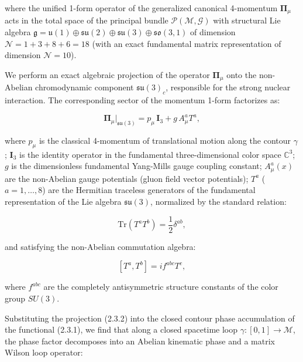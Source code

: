 \documentclass[11pt,a4paper]{article}
\theoremstyle{definition}
\begin{document}
where the unified 1-form operator of the generalized canonical 4-momentum $\mathbf{\Pi}_\mu$ acts in the total space of the principal bundle $\mathcal{P}(\mathcal{M}, \mathcal{G})$ with structural Lie algebra $\mathfrak{g} = \mathfrak{u}(1) \oplus \mathfrak{su}(2) \oplus \mathfrak{su}(3) \oplus \mathfrak{so}(3,1)$ of dimension $\mathcal{N} = 1 + 3 + 8 + 6 = 18$ (with an exact fundamental matrix representation of dimension $\mathcal{N} = 10$).

We perform an exact algebraic projection of the operator $\mathbf{\Pi}_\mu$ onto the non-Abelian chromodynamic component $\mathfrak{su}(3)_c$, responsible for the strong nuclear interaction. The corresponding sector of the momentum 1-form factorizes as:

\begin{equation}\label{eq:2.3.2}\tag{2.3.2}
\mathbf{\Pi}_\mu \Big|_{\mathfrak{su}(3)} = p_\mu \, \mathbf{I}_3 + g \, A_\mu^a T^a,
\end{equation}

where $p_\mu$ is the classical 4-momentum of translational motion along the contour $\gamma$;  
$\mathbf{I}_3$ is the identity operator in the fundamental three-dimensional color space $\mathbb{C}^3$;  
$g$ is the dimensionless fundamental Yang-Mills gauge coupling constant;  
$A_\mu^a(x)$ are the non-Abelian gauge potentials (gluon field vector potentials);  
$T^a$ ($a = 1, \dots, 8$) are the Hermitian traceless generators of the fundamental representation of the Lie algebra $\mathfrak{su}(3)$, normalized by the standard relation:

\begin{equation}\label{eq:2.3.3}\tag{2.3.3}
\text{Tr}\left( T^a T^b \right) = \frac{1}{2} \delta^{ab},
\end{equation}

and satisfying the non-Abelian commutation algebra:

\begin{equation}\label{eq:2.3.4}\tag{2.3.4}
\left[ T^a, T^b \right] = i f^{abc} T^c,
\end{equation}

where $f^{abc}$ are the completely antisymmetric structure constants of the color group $SU(3)$.

Substituting the projection (2.3.2) into the closed contour phase accumulation of the functional (2.3.1), we find that along a closed spacetime loop $\gamma: [0, 1] \to \mathcal{M}$, the phase factor decomposes into an Abelian kinematic phase and a matrix Wilson loop operator:
\end{document}
